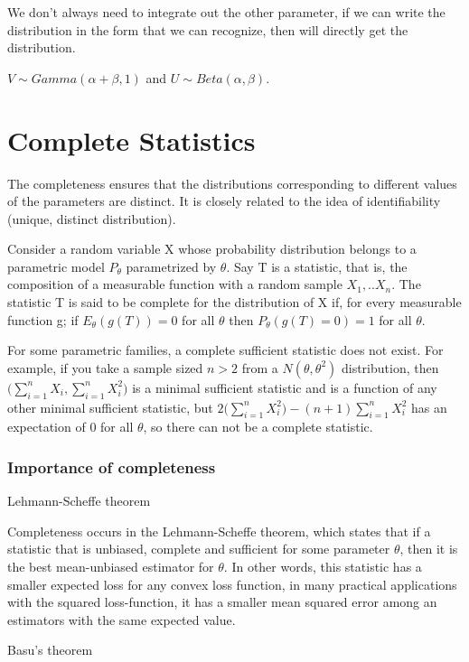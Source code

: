 \begin{itemize}
We don't always need to integrate out the other parameter, if we can write the distribution in the form that we can recognize, then will directly get the distribution. 

$V \sim Gamma (\alpha + \beta, 1)$ and $U \sim Beta(\alpha, \beta)$.

\end{itemize}

\section{Complete Statistics}

The completeness ensures that the distributions corresponding to different values of the parameters are distinct. It is closely related to the idea of identifiability (unique, distinct distribution).

\begin{Definition}
Consider a random variable X whose probability distribution belongs to a parametric model $P_{\theta}$ parametrized by $\theta$. Say T is a statistic, that is, the composition of a measurable function with a random sample $X_1,.. X_n$. The statistic T is said to be complete for the distribution of X if, for every measurable function g; 
if $E_{\theta} (g(T)) = 0$ for all $\theta$ then $P_{\theta}(g(T) = 0) = 1$ for all $\theta$. 
\end{Definition}

For some parametric families, a complete sufficient statistic does not exist. For example, if you take a sample sized $n > 2$ from a $N(\theta, \theta^2)$ distribution, then 
$\Big( \sum_{i=1}^n X_i, \sum_{i=1}^n X_i^2 \Big)$ is a minimal sufficient statistic and is a function of any other minimal sufficient statistic, but $2 \Big( \sum_{i=1}^n X_i^2 \Big) - (n+1) \sum_{i=1}^n X_i^2$ has an expectation of 0 for all $\theta$, so there can not be a complete statistic. 

\subsubsection{Importance of completeness}

Lehmann-Scheffe theorem

Completeness occurs in the Lehmann-Scheffe theorem, which states that if a statistic that is unbiased, complete and sufficient for some parameter $\theta$, then it is the best mean-unbiased estimator for $\theta$. In other words, this statistic has a smaller expected loss for any convex loss function, in many practical applications with the squared loss-function, it has a smaller mean squared error among an estimators with the same expected value. 

Basu's theorem



